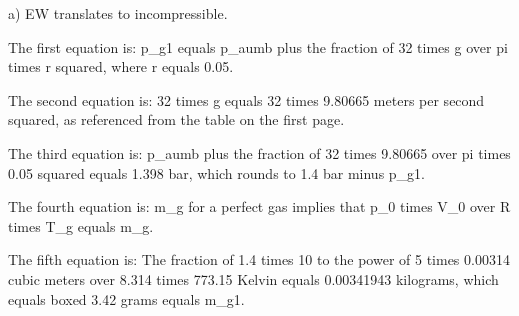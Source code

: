 a) EW translates to incompressible.

The first equation is:
p_g1 equals p_aumb plus the fraction of 32 times g over pi times r squared, where r equals 0.05.

The second equation is:
32 times g equals 32 times 9.80665 meters per second squared, as referenced from the table on the first page.

The third equation is:
p_aumb plus the fraction of 32 times 9.80665 over pi times 0.05 squared equals 1.398 bar, which rounds to 1.4 bar minus p_g1.

The fourth equation is:
m_g for a perfect gas implies that p_0 times V_0 over R times T_g equals m_g.

The fifth equation is:
The fraction of 1.4 times 10 to the power of 5 times 0.00314 cubic meters over 8.314 times 773.15 Kelvin equals 0.00341943 kilograms, which equals boxed 3.42 grams equals m_g1.
